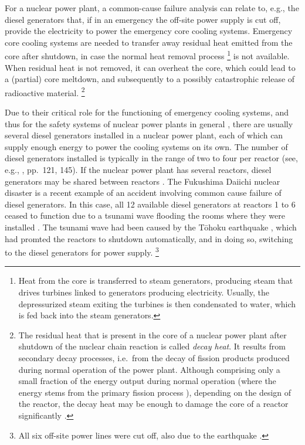 For a nuclear power plant, a common-cause failure analysis can relate to, e.g.,
the diesel generators that, if in an emergency the off-site power supply is cut off,
provide the electricity to power the emergency core cooling systems.
Emergency core cooling systems are needed to transfer away residual heat emitted from the core after shutdown,
in case the normal heat removal process%
\footnote{Heat from the core is transferred to steam generators,
producing steam that drives turbines linked to generators producing electricity.
Usually, the depressurized steam exiting the turbines
is then condensated to water, which is fed back into the steam generators.}
is not available.
When residual heat is not removed, it can overheat the core,
which could lead to a (partial) core meltdown,
and subsequently to a possibly catastrophic release of radioactive material.%
\footnote{The residual heat that is present in the core of a nuclear power plant
after shutdown of the nuclear chain reaction is called \emph{decay heat}.
It results from secondary decay processes,
i.e.\ from the decay of fission products produced during normal operation of the power plant.
Although comprising only a small fraction of the energy output during normal operation
(where the energy stems from the primary fission process \parencite[Module~4, p.~33]{united1993doe}),
depending on the design of the reactor,
the decay heat may be enough to damage the core of a reactor significantly
\parencite[pp.~VIII-9 and VIII-25f]{1975:reactor:safety:study}.}

Due to their critical role for the functioning of emergency cooling systems,
and thus for the safety systems of nuclear power plants in general \parencite[pp.~1, 4]{csni86-115},
there are usually several diesel generators installed in a nuclear power plant,
each of which can supply enough energy to power the cooling systems on its own.
The number of diesel generators installed is typically in the range of two to four per reactor
(see, e.g., \textcite{csni86-115}, pp.~121, 145).
If the nuclear power plant has several reactors, diesel generators may be shared between reactors \parencite[p.~7]{2004:iaea::emergencypower}.
The Fukushima Daiichi nuclear disaster is a recent example of an accident
involving common cause failure of diesel generators.
In this case, all 12 available diesel generators at reactors 1 to 6 
ceased to function due to a tsunami wave flooding the rooms where they were installed \parencite[p.~31]{2011:iaea::report}.
The tsunami wave had been caused by the T\={o}hoku earthquake \parencite[e.g.,][]{2012:ritsema},
which had promted the reactors to shutdown automatically, and in doing so,
switching to the diesel generators for power supply.%
\footnote{All six off-site power lines were cut off, also due to the earthquake \parencite[p.~31]{2011:iaea::report}.}

